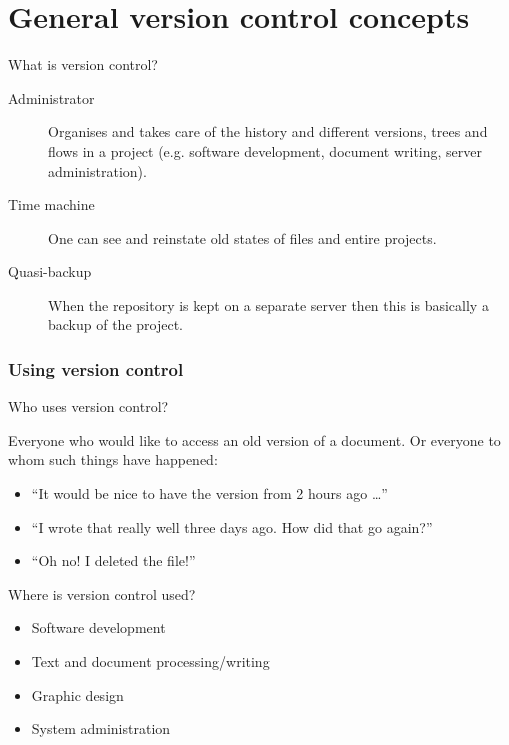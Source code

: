 \section{General version control concepts}

\begin{frame}{What is version control?}

\begin{description}
\item[Administrator] Organises and takes care of the history and different
    versions, trees and flows in a project (e.g. software development,
    document writing, server administration).
\item[Time machine] One can see and reinstate old states of files and entire
    projects.
\item[Quasi-backup] When the repository is kept on a separate server then
    this is basically a backup of the project.
\end{description}

\end{frame}


\begin{frame}
\frametitle{Using version control}
{\large \alert{Who uses version control?}}

Everyone who would like to access an old version of a document.  Or everyone
to whom such things have happened:
\begin{itemize}
    \item \enquote{It would be nice to have the version from 2 hours ago \ldots}
    \item \enquote{I wrote that really well three days ago.  How did that go
        again?}
    \item \enquote{Oh no!  I deleted the file!}
\end{itemize}

{\large \alert{Where is version control used?}}
\begin{itemize}
\item Software development
\item Text and document processing/writing
\item Graphic design
\item System administration
\end{itemize}
\end{frame}

